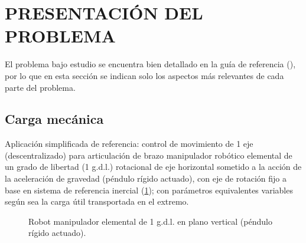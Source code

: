 \documentclass[a4paper, 10pt, onecolumn,journal]{ieeeconf}
\begin{document}
\newpage

\section{PRESENTACIÓN DEL PROBLEMA}
El problema bajo estudio se encuentra bien detallado en la guía de referencia (\cite{c1}), por lo que en esta sección se indican solo los aspectos más relevantes de cada parte del problema.

\subsection{\textbf{Carga mecánica}}
Aplicación simplificada de referencia: control de movimiento de 1 eje (descentralizado) para articulación de brazo manipulador robótico elemental de un grado de libertad (1 g.d.l.) rotacional de eje horizontal sometido a la acción de la aceleración de gravedad (péndulo rígido actuado), con eje de rotación fijo a base en sistema de referencia inercial (\cref{brazo}); con parámetros equivalentes variables según sea la carga útil transportada en el extremo.

\begin{figure}[H]
    \centering
    \begin{adjustbox}{max width=0.5\columnwidth}
    \end{adjustbox}
    \caption{Robot manipulador elemental de 1 g.d.l. en plano vertical (péndulo rígido actuado).}
    \label{brazo}
\end{figure}
\end{document}
